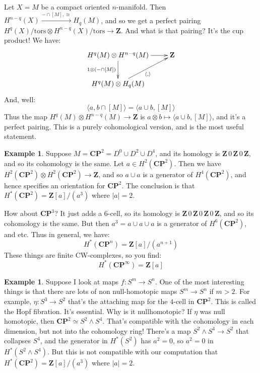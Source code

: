 \documentclass{amsart}
\theoremstyle{theorem}
\theoremstyle{definition}
\newtheorem{example}[theorem]{Example}
\newcommand{\CP}{\mathbf{CP}}
\newcommand{\Z}{\mathbf Z}
\begin{document}
Let $X=M$ be a compact oriented $n$-manifold. Then $H^{n-q}(X)\xrightarrow{-\cap[M],\cong}H_q(M)$, and so we get a perfect pairing $H^q(X)/\mathrm{tors}\otimes H^{n-q}(X)/\mathrm{tors}\to\Z$. And what is that pairing? It's the cup product! We have:
\begin{equation*}
\xymatrix{
	H^q(M)\otimes H^{n-q}(M)\ar[r]\ar[d]_{1\otimes(-\cap [M])} & \Z\\
	H^q(M)\otimes H_q(M)\ar[ur]_{\langle,\rangle}
}
\end{equation*}
And, well:
\begin{equation*}
\langle a,b\cap [M]\rangle = \langle a\cup b,[M]\rangle
\end{equation*}
Thus the map $H^q(M)\otimes H^{n-q}(M)\to \Z$ is $a\otimes b\mapsto\langle a\cup b,[M]\rangle$, and it's a perfect pairing. This is a purely cohomological version, and is the most useful statement.
\begin{example}
Suppose $M=\CP^2=D^0\cup D^2\cup D^4$, and its homology is $\Z \, 0 \, \Z \, 0\, \Z$, and so its cohomology is the same. Let $a\in H^2(\CP^2)$. Then we have $H^2(\CP^2)\otimes H^2(\CP^2)\to \Z$, and so $a\cup a$ is a generator of $H^4(\CP^2)$, and hence specifies an orientation for $\CP^2$. The conclusion is that $H^\ast(\CP^2)=\Z[a]/(a^3)$ where $|a|=2$.

How about $\CP^3$? It just adds a $6$-cell, so its homology is $\Z \, 0 \, \Z \, 0\, \Z \, 0 \, \Z$, and so its cohomology is the same. But then $a^3=a\cup a\cup a$ is a generator of $H^6(\CP^2)$, and etc. Thus in general, we have:
$$H^\ast(\CP^n)=\Z[a]/(a^{n+1})$$
These things are finite CW-complexes, so you find:
\begin{equation}
H^\ast(\CP^\infty)=\Z[a]
\end{equation}
\end{example}
\begin{example}
Suppose I look at maps $f:S^m\to S^n$. One of the most interesting things is that there are lots of non null-homotopic maps $S^m\to S^n$ if $m>2$. For example, $\eta:S^3\to S^2$ that's the attaching map for the $4$-cell in $\CP^2$. This is called the Hopf fibration. It's essential. Why is it nullhomotopic? If $\eta$ was null homotopic, then $\CP^2\simeq S^2\wedge S^4$. That's compatible with the cohomology in each dimension, but not into the cohomology ring! There's a map $S^2\wedge S^4\to S^2$ that collapses $S^4$, and the generator in $H^\ast(S^2)$ has $a^2=0$, so $a^2=0$ in $H^\ast(S^2\wedge S^4)$. But this is not compatible with our computation that $H^\ast(\CP^2)=\Z[a]/(a^3)$ where $|a|=2$.
\end{example}
\end{document}
